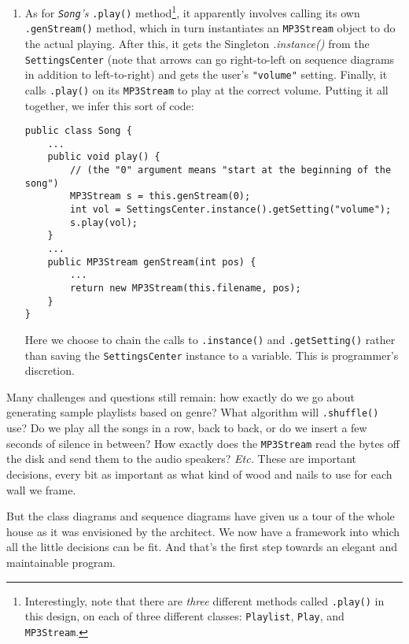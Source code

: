 \begin{enumerate}
\item As for \textit{\texttt{Song}'s} \texttt{.play()}
method\footnote{Interestingly, note that there are \textit{three} different
methods called \texttt{.play()} in this design, on each of three different
classes: \texttt{Playlist}, \texttt{Play}, and \texttt{MP3Stream}.}, it
apparently involves calling its own \texttt{.genStream()} method, which in
turn instantiates an \texttt{MP3Stream} object to do the actual playing. After
this, it gets the Singleton \textit{.instance()} from the
\texttt{SettingsCenter} (note that arrows can go right-to-left on sequence
diagrams in addition to left-to-right) and gets the user's \texttt{"volume"}
setting. Finally, it calls \texttt{.play()} on its \texttt{MP3Stream} to play
at the correct volume. Putting it all together, we infer this sort of code:

\begin{Verbatim}[fontsize=\scriptsize,samepage=true,frame=single]
public class Song {
    ...
    public void play() {
        // (the "0" argument means "start at the beginning of the song")
        MP3Stream s = this.genStream(0);  
        int vol = SettingsCenter.instance().getSetting("volume");
        s.play(vol);
    }
    ...
    public MP3Stream genStream(int pos) {
        ...
        return new MP3Stream(this.filename, pos);
    }
}
\end{Verbatim}

Here we choose to chain the calls to \texttt{.instance()} and
\texttt{.getSetting()} rather than saving the \texttt{SettingsCenter} instance
to a variable. This is programmer's discretion. 



\end{enumerate}

Many challenges and questions still remain: how exactly do we go about
generating sample playlists based on genre? What algorithm will
\texttt{.shuffle()} use? Do we play all the songs in a row, back to back, or
do we insert a few seconds of silence in between? How exactly does the
\texttt{MP3Stream} read the bytes off the disk and send them to the audio
speakers? \textit{Etc.} These are important decisions, every bit as important
as what kind of wood and nails to use for each wall we frame. 

But the class diagrams and sequence diagrams have given us a tour of the whole
house as it was envisioned by the architect. We now have a framework into
which all the little decisions can be fit. And that's the first step towards
an elegant and maintainable program.

